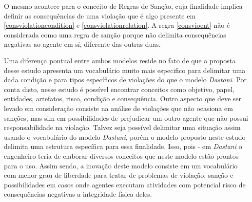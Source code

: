 O mesmo acontece para o conceito de Regras de Sanção, cuja finalidade implica definir as consequências de uma violação que é algo presente em 
\ref{consviolationcondition} e \ref{consviolationrelation}. A regra \ref{consvioent} não é considerada como uma regra de sanção porque 
não delimita consequências negativas ao agente em sí, diferente das outras duas. 

Uma diferença pontual entre ambos modelos reside no fato de que a proposta desse estudo apresenta um vocabulário muito mais especifico para delimitar 
uma dada condição e para tipos específicos de violações do que o modelo \textit{Dastani}. Por conta disto, nesse estudo é possível encontrar conceitos 
como objetivo, papel, entidades, artefatos, risco, condição e consequência. Outro aspecto que deve ser levado em consideração consiste na análise de 
violações que não ocasiona em sanções, mas sim em possibilidades de prejudicar um outro agente que não possui responsabilidade na violação. Talvez 
seja possível delimitar uma situação assim usando o vocabulário do modelo \textit{Dastani}, porém o modelo proposto neste estudo delimita uma estrutura 
específica para essa finalidade. Isso, pois - em \textit{Dastani} o engenheiro teria de elaborar diversos conceitos que neste modelo estão prontos 
para o uso. Assim sendo, a inovação deste modelo consiste em um vocabulário com menor grau de liberdade para tratar de problemas de violação, sanção 
e possibilidades em casos onde agentes executam atividades com potencial risco de consequências negativas a integridade física deles. 